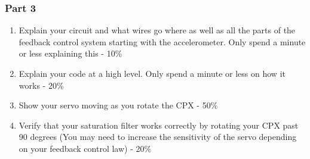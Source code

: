 \subsubsection{Part 3}
\begin{enumerate}[itemsep=-5pt]
\item Explain your circuit and what wires go where as well as all the parts of the feedback control system starting with the accelerometer. Only spend a minute or less explaining this - 10\%
\item Explain your code at a high level. Only spend a minute or less on how it works - 20\%
\item Show your servo moving as you rotate the CPX - 50\%
\item Verify that your saturation filter works correctly by rotating your CPX past 90 degrees (You may need to increase the sensitivity of the servo depending on your feedback control law) - 20\% 
\end{enumerate}
